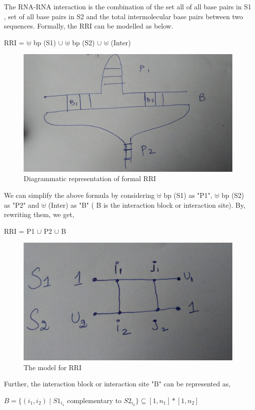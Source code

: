 \documentclass[twoside,a4paper]{report}
\begin{document}
 	The RNA-RNA interaction is the combination of the set all of all base pairs in S1 , set of all base pairs in S2 and the total intermolecular base pairs between two sequences. Formally, the RRI can be modelled as below.

 	\begin{center}
 		 RRI = $ \uplus $ bp (S1) $ \cup $ $\uplus$ bp (S2) $\cup$ $\uplus$ (Inter)
 	\end{center}
 
	 	\begin{figure}[H]
		\includegraphics[width=0.6\linewidth]{RRI3}
		\centering
		\caption{Diagrammatic representation of formal RRI }
		\label{fig:RRI3}
	\end{figure}
	
 	We can simplify the above formula by considering  $ \uplus $ bp (S1) as "P1", $\uplus$ bp (S2) as "P2" and $\uplus$ (Inter) as "B" ( B is the interaction block or interaction site). By, rewriting them, we get, 
 	
 	\begin{center}
 		RRI =  P1 $ \cup $  P2 $\cup$ B
 	\end{center}
 
 	\begin{figure}[H]
 		\includegraphics[width=0.6\linewidth]{RRI}
 		\centering
 		\caption{The model for RRI }
 		\label{fig:RRI}
 	\end{figure}
 
 	Further, the interaction block or interaction site "B" can be represented as,
 	
 	\begin{center}
 	 $B = \{ (i_1 , i_2)  \mid  S1_{i_1}$ complementary to $ S2_{i_2} \} \subseteq [ 1, n_1] * [1 , n_2] $
 	\end{center}
 	
\end{document}

